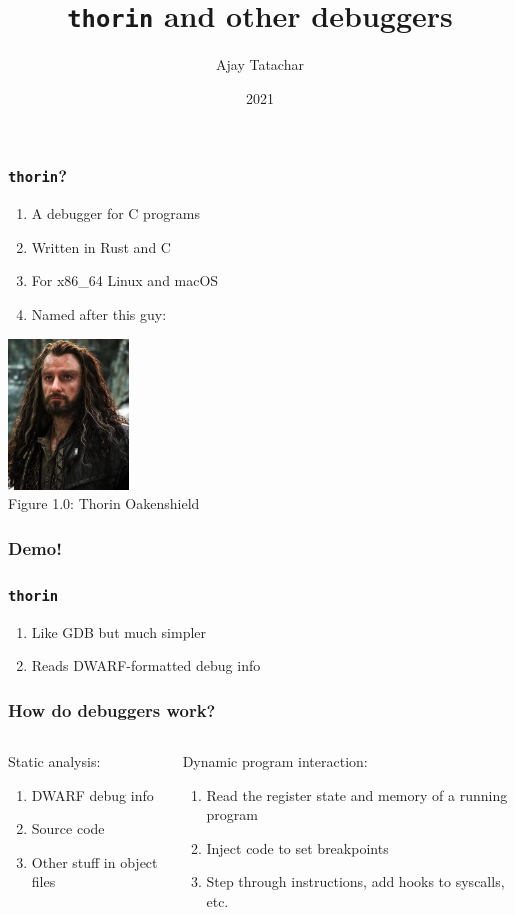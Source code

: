 \documentclass{beamer}
\title{\texttt{thorin} and other debuggers}
\author{Ajay Tatachar}
\institute{GLUG}
\date{2021}
\begin{document}
\frame{\titlepage}

\begin{frame}
\frametitle{\texttt{thorin}?}
\begin{enumerate}
\item{A debugger for C programs}
\item{Written in Rust and C}
\item{For x86\_64 Linux and macOS}
\item{Named after this guy:}
\end{enumerate}

\begin{center}
\includegraphics[height=4cm]{thorin}\\
Figure 1.0: Thorin Oakenshield
\end{center}

\end{frame}

\begin{frame}
\frametitle{Demo!}
\end{frame}

\begin{frame}
\frametitle{\texttt{thorin}}
\begin{enumerate}
\item{Like GDB but much simpler}
\item{Reads DWARF-formatted debug info}
\end{enumerate}
\end{frame}

\begin{frame}
\frametitle{How do debuggers work?}

\begin{columns}
\begin{column}{0.48\textwidth}
Static analysis:
\begin{enumerate}
\item{DWARF debug info}
\item{Source code}
\item{Other stuff in object files}
\end{enumerate}
\end{column}
\begin{column}{0.48\textwidth}
Dynamic program interaction:
\begin{enumerate}
\item{Read the register state and memory of a running program}
\item{Inject code to set breakpoints}
\item{Step through instructions, add hooks to syscalls, etc.}
\end{enumerate}
\end{column}
\end{columns}
\end{frame}
\end{document}
